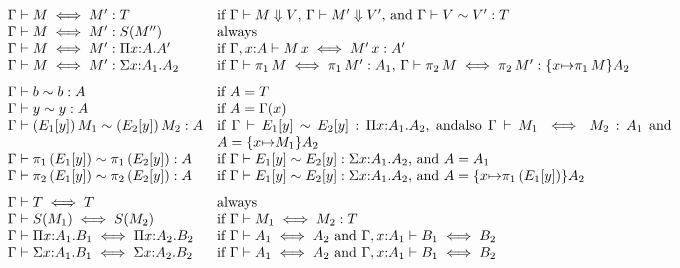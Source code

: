 \documentclass{article}
\theoremstyle{break}
\begin{document}
\[\begin{array}{lp{4.5truein}}
\aconequiv{\context}{\constructor}{\constructor'}{\ktype}&
  if
    $\headnormsto{\context}{\constructor}{\kind}{\cvalue}$,
    $\headnormsto{\context}{\constructor'}{\kind}{\cvalue'}$, and
    $\weakconequiv{\context}{\cvalue}{\cvalue'}{\ktype}$\\
\aconequiv{\context}{\constructor}{\constructor'}{\ksingleton{\constructor''}}&
  always\\
\aconequiv{\context}{\constructor}{\constructor'}
  {\kpi{\cvar}{\kind}{\kind'}}&
  if
  $\aconequiv{\context,\cvar{:}\kind}{\capply{\constructor}{\cvar}}
           {\capply{\constructor'}{\cvar}}{\kind'}$\\ %
\aconequiv{\context}{\constructor}{\constructor'}
  {\ksigma{\cvar}{\kind_1}{\kind_2}}&
  if
  $\aconequiv{\context}{\cpi{1}{\constructor}}
     {\cpi{1}{\constructor'}}{\kind_1}$, %
  $\aconequiv{\context}{\cpi{2}{\constructor}}
           {\cpi{2}{\constructor'}}
           {\substitute{\cvar}{\cpi{1}{\constructor}}\kind_2}$\\[7pt]

\weakconequiv{\context}{\basetype}{\basetype}{\kind}&
  if $\kind=\ktype$\\
\weakconequiv{\context}{\othercvar}{\othercvar}{\kind}&
  if $\kind=\context(\cvar)$\\
\weakconequiv{\context}{\capply{(E_1[\othercvar])}{\constructor_1}}
  {\capply{(E_2[\othercvar])}{\constructor_2}}{\kind}&
  if 
  $\weakconequiv{\context}{E_1[\othercvar]}{E_2[\othercvar]}
    {\kpi{\cvar}{\kind_1}{\kind_2}}$,
  andalso
  $\aconequiv{\context}{\constructor_1}{\constructor_2}{\kind_1}$ and
  $\kind = \substitute{\cvar}{\constructor_1}{\kind_2}$\\
\weakconequiv{\context}{\cpi{1}{(E_1[\othercvar])}}
  {\cpi{1}{(E_2[\othercvar])}}{\kind}&
  if $\weakconequiv{\context}{E_1[\othercvar]}{E_2[\othercvar]}
    {\ksigma{\cvar}{\kind_1}{\kind_2}}$,
  and
  $\kind = \kind_1$\\
\weakconequiv{\context}{\cpi{2}{(E_1[\othercvar])}}
  {\cpi{2}{(E_2[\othercvar])}}{\kind}&
  if $\weakconequiv{\context}{E_1[\othercvar]}{E_2[\othercvar]}
    {\ksigma{\cvar}{\kind_1}{\kind_2}}$,
  and
  $\kind = \substitute{\cvar}{\cpi{1}{(E_1[\othercvar])}}{\kind_2}$\\[7pt]

\akindequiv{\context}{\ktype}{\ktype}&always\\
\akindequiv{\context}{\ksingleton{\constructor_1}}
   {\ksingleton{\constructor_2}}&
  if $\aconequiv{\context}{\constructor_1}{\constructor_2}{\ktype}$\\
\akindequiv{\context}{\kpi{\cvar}{\kind_1}{\otherkind_1}} 
   {\kpi{\cvar}{\kind_2}{\otherkind_2}}&
  if $\akindequiv{\context}{\kind_1}{\kind_2}$ and
  $\akindequiv{\context,\cvar{:}\kind_1}{\otherkind_1}{\otherkind_2}$\\
\akindequiv{\context}{\ksigma{\cvar}{\kind_1}{\otherkind_1}} 
   {\ksigma{\cvar}{\kind_2}{\otherkind_2}}&
  if $\akindequiv{\context}{\kind_1}{\kind_2}$ and
  $\akindequiv{\context,\cvar{:}\kind_1}{\otherkind_1}{\otherkind_2}$\\
\end{array}
\]
\end{document}
